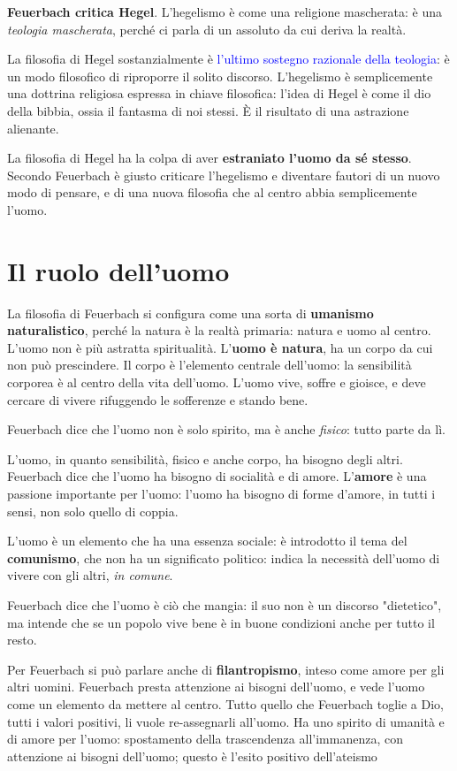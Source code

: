 \documentclass[a4paper, twoside, titlepage]{book}
\renewcommand{\emph}[1]{\textcolor{blue}{#1}}
\begin{document}
\textbf{Feuerbach critica Hegel}. L'hegelismo è come una religione mascherata: è una \textit{teologia mascherata}, perché ci parla di un assoluto da cui deriva la realtà.

La filosofia di Hegel sostanzialmente è \emph{l'ultimo sostegno razionale della teologia}: è un modo filosofico di riproporre il solito discorso. L'hegelismo è semplicemente una dottrina religiosa espressa in chiave filosofica: l'idea di Hegel è come il dio della bibbia, ossia il fantasma di noi stessi. È il risultato di una astrazione alienante.

La filosofia di Hegel ha la colpa di aver \textbf{estraniato l'uomo da sé stesso}. Secondo Feuerbach è giusto criticare l'hegelismo e diventare fautori di un nuovo modo di pensare, e di una nuova filosofia che al centro abbia semplicemente l'uomo.

\section{Il ruolo dell'uomo}

La filosofia di Feuerbach si configura come una sorta di \textbf{umanismo naturalistico}, perché la natura è la realtà primaria: natura e uomo al centro.
L'uomo non è più astratta spiritualità. L'\textbf{uomo è natura}, ha un corpo da cui non può prescindere.
Il corpo è l'elemento centrale dell'uomo: la sensibilità corporea è al centro della vita dell'uomo.
L'uomo vive, soffre e gioisce, e deve cercare di vivere rifuggendo le sofferenze e stando bene.

Feuerbach dice che l'uomo non è solo spirito, ma è anche \textit{fisico}: tutto parte da lì.

L'uomo, in quanto sensibilità, fisico e anche corpo, ha bisogno degli altri. Feuerbach dice che l'uomo ha bisogno di socialità e di amore.
L'\textbf{amore} è una passione importante per l'uomo: l'uomo ha bisogno di forme d'amore, in tutti i sensi, non solo quello di coppia.

L'uomo è un elemento che ha una essenza sociale: è introdotto il tema del \textbf{comunismo}, che non ha un significato politico: indica la necessità dell'uomo di vivere con gli altri, \textit{in comune}.

Feuerbach dice che l'uomo è ciò che mangia: il suo non è un discorso "dietetico", ma intende che se un popolo vive bene è in buone condizioni anche per tutto il resto.

Per Feuerbach si può parlare anche di \textbf{filantropismo}, inteso come amore per gli altri uomini. Feuerbach presta attenzione ai bisogni dell'uomo, e vede l'uomo come un elemento da mettere al centro.
Tutto quello che Feuerbach toglie a Dio, tutti i valori positivi, li vuole re-assegnarli all'uomo.
Ha uno spirito di umanità e di amore per l'uomo: spostamento della trascendenza all'immanenza, con attenzione ai bisogni dell'uomo; questo è l'esito positivo dell'ateismo
\end{document}
